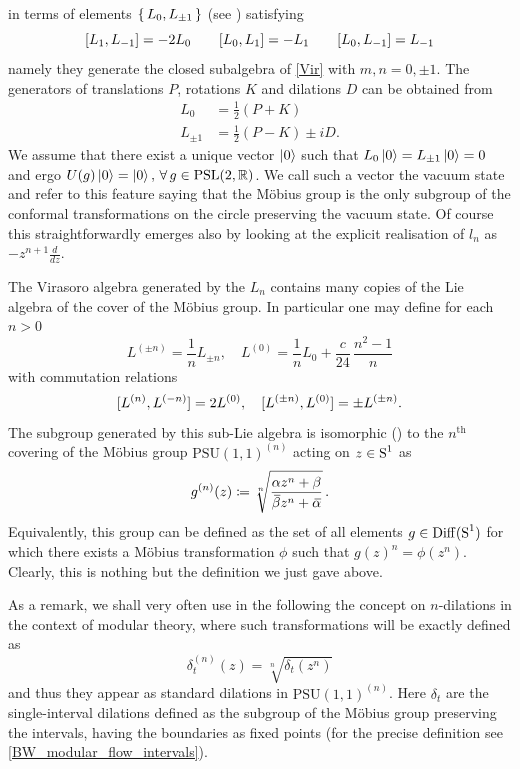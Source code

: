 in terms of elements $\set{L_0,L_{\pm 1}}$ (see \cite*{Longo:private}) 
satisfying 
\[
[L_1,L_{-1}]=-2 L_0\qquad
[L_0,L_{1}]=-L_{1}\qquad
[L_0,L_{-1}]=L_{-1}
\]
namely they generate the closed subalgebra of \eqref{Vir} with $m,n=0,\pm 1$.
The generators of translations $P$, rotations $K$ and
dilations $D$ can be obtained from
\begin{align*}
L_0&=\frac{1}{2} (P+K)\\
L_{\pm 1}&= \frac{1}{2}(P-K)\pm iD.
\end{align*}
We assume that there
exist a unique vector $\ket{0}$ such that $L_0\ket{0}=L_{\pm 1}\ket{0}=0$
and ergo $U(g)\ket{0}=\ket{0},\,\forall\,g\in \textrm{PSL}(2,\mathbb{R})$. We call such
a vector the vacuum state and refer to this feature saying that the M\"obius
group is the only subgroup of the conformal transformations on the circle 
preserving the vacuum state. Of course this straightforwardly emerges also
by looking at the explicit realisation of $l_n$ as $-z^{n+1} \frac{d}{dz}$.

\bigskip
The Virasoro algebra generated by the $L_n$ contains many 
copies of the Lie algebra of the cover of the M\"obius group. 
In particular one may define for each $n> 0$
\[
L^{(\pm n)}=\frac{1}{n}L_{\pm n},\quad
L^{(0)}=\frac{1}{n}L_0 +\frac{c}{24}\,\frac{n^2-1}{n}
\]
with commutation relations
\[
[L^{(n)},L^{(-n)}]=2 L^{(0)},\quad
[L^{(\pm n)},L^{(0)}]=\pm L^{(\pm n)}.
\]
The subgroup generated by this sub-Lie algebra  
is isomorphic (\cite{LX:2004}) to
the $n^{\textrm{th}}$ covering of the M\"obius group 
$\textrm{PSU}(1,1)^{(n)}$ acting on $z\in\textrm{S}^1$ as
\[
g^{(n)}(z)\coloneqq\sqrt[n]{\frac{\alpha z^n +\beta}
{{}\mkern3mu\overline{\mkern-3mu\beta}z^n + {}\mkern3mu\overline{\mkern-3mu\alpha}}}\,.
\]
Equivalently, this group can be defined as the set of all
elements $g\in\operatorname{Diff}(\textrm{S}^1)$ for which there exists a M\"obius
transformation $\phi$ such that $g(z)^n=\phi(z^n)$. Clearly,
this is nothing but the definition we just gave above.

As a remark, we shall very often use in the following the
concept on $n$-dilations in the context of modular theory,
where such transformations will be exactly defined as
\[
\delta_t^{(n)}(z)=\sqrt[n]{\delta_t(z^n)}
\]
and thus they appear as standard dilations in 
$\textrm{PSU}(1,1)^{(n)}$. Here $\delta_t$ are 
the single-interval dilations defined as the 
subgroup of the M\"obius group preserving the 
intervals, having the boundaries as fixed points 
(for the precise definition see 
\ref{BW_modular_flow_intervals}).






